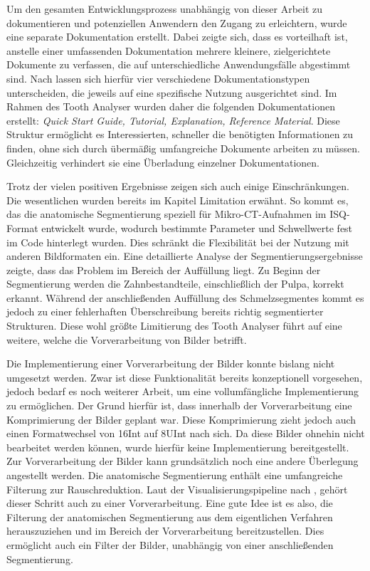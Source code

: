 Um den gesamten Entwicklungsprozess unabhängig von dieser Arbeit zu
dokumentieren und potenziellen Anwendern den Zugang zu erleichtern, wurde eine separate
Dokumentation erstellt. Dabei zeigte sich, dass es vorteilhaft ist, anstelle
einer umfassenden Dokumentation mehrere kleinere, zielgerichtete Dokumente zu verfassen,
die auf unterschiedliche Anwendungsfälle abgestimmt sind. Nach \citet{procida2017}
lassen sich hierfür vier verschiedene Dokumentationstypen unterscheiden, die jeweils
auf eine spezifische Nutzung ausgerichtet sind. Im Rahmen des Tooth Analyser
wurden daher die folgenden Dokumentationen erstellt: \textit{Quick Start Guide, Tutorial,
Explanation, Reference Material}. Diese Struktur ermöglicht es Interessierten,
schneller die benötigten Informationen zu finden, ohne sich durch übermäßig umfangreiche
Dokumente arbeiten zu müssen. Gleichzeitig verhindert sie eine Überladung
einzelner Dokumentationen.

Trotz der vielen positiven Ergebnisse zeigen sich auch einige Einschränkungen. Die
wesentlichen wurden bereits im Kapitel Limitation erwähnt. So kommt es, das die anatomische
Segmentierung speziell für Mikro-\ac{CT}-Aufnahmen im \ac{ISQ}-Format entwickelt
wurde, wodurch bestimmte Parameter und Schwellwerte fest im Code hinterlegt
wurden. Dies schränkt die Flexibilität bei der Nutzung mit anderen Bildformaten ein.
Eine detaillierte Analyse der Segmentierungsergebnisse zeigte, dass das Problem im
Bereich der Auffüllung liegt. Zu Beginn der Segmentierung werden die
Zahnbestandteile, einschließlich der Pulpa, korrekt erkannt. Während der anschließenden
Auffüllung des Schmelzsegmentes kommt es jedoch zu einer fehlerhaften Überschreibung
bereits richtig segmentierter Strukturen. Diese wohl größte Limitierung des
Tooth Analyser führt auf eine weitere, welche die Vorverarbeitung von Bilder betrifft.

Die Implementierung einer Vorverarbeitung der Bilder konnte bislang nicht umgesetzt
werden. Zwar ist diese Funktionalität bereits konzeptionell vorgesehen, jedoch bedarf
es noch weiterer Arbeit, um eine vollumfängliche Implementierung zu ermöglichen.
Der Grund hierfür ist, dass innerhalb der Vorverarbeitung eine Komprimierung der
Bilder geplant war. Diese Komprimierung zieht jedoch auch einen Formatwechsel von
\ac{16Int} auf \ac{8UInt} nach sich. Da diese Bilder ohnehin nicht bearbeitet
werden können, wurde hierfür keine Implementierung bereitgestellt. Zur
Vorverarbeitung der Bilder kann grundsätzlich noch eine andere Überlegung
angestellt werden. Die anatomische Segmentierung enthält eine umfangreiche Filterung
zur Rauschreduktion. Laut der Visualisierungspipeline nach \citet[S.~50]{handels2000},
gehört dieser Schritt auch zu einer Vorverarbeitung. Eine gute Idee ist es also,
die Filterung der anatomischen Segmentierung aus dem eigentlichen Verfahren
herauszuziehen und im Bereich der Vorverarbeitung bereitzustellen. Dies ermöglicht
auch ein Filter der Bilder, unabhängig von einer anschließenden Segmentierung.

